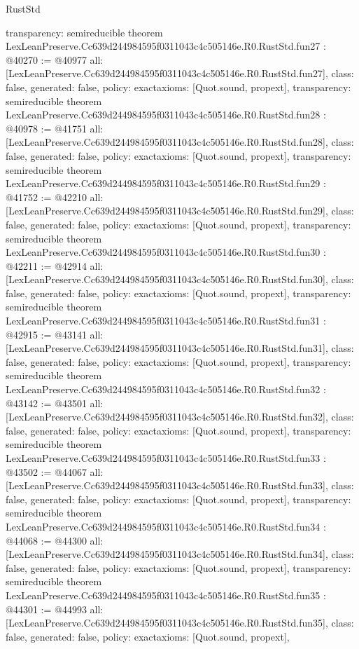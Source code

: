 \begin{lexlean}{RustStd}
\begin{coremodule}
{  transparency: semireducible
}
theorem LexLeanPreserve.Cc639d244984595f0311043c4c505146e.R0.RustStd.fun27 : @40270 := @40977 {
  all: [LexLeanPreserve.Cc639d244984595f0311043c4c505146e.R0.RustStd.fun27],
  class: false,
  generated: false,
  policy: exact{axioms: [Quot.sound, propext]},
  transparency: semireducible
}
theorem LexLeanPreserve.Cc639d244984595f0311043c4c505146e.R0.RustStd.fun28 : @40978 := @41751 {
  all: [LexLeanPreserve.Cc639d244984595f0311043c4c505146e.R0.RustStd.fun28],
  class: false,
  generated: false,
  policy: exact{axioms: [Quot.sound, propext]},
  transparency: semireducible
}
theorem LexLeanPreserve.Cc639d244984595f0311043c4c505146e.R0.RustStd.fun29 : @41752 := @42210 {
  all: [LexLeanPreserve.Cc639d244984595f0311043c4c505146e.R0.RustStd.fun29],
  class: false,
  generated: false,
  policy: exact{axioms: [Quot.sound, propext]},
  transparency: semireducible
}
theorem LexLeanPreserve.Cc639d244984595f0311043c4c505146e.R0.RustStd.fun30 : @42211 := @42914 {
  all: [LexLeanPreserve.Cc639d244984595f0311043c4c505146e.R0.RustStd.fun30],
  class: false,
  generated: false,
  policy: exact{axioms: [Quot.sound, propext]},
  transparency: semireducible
}
theorem LexLeanPreserve.Cc639d244984595f0311043c4c505146e.R0.RustStd.fun31 : @42915 := @43141 {
  all: [LexLeanPreserve.Cc639d244984595f0311043c4c505146e.R0.RustStd.fun31],
  class: false,
  generated: false,
  policy: exact{axioms: [Quot.sound, propext]},
  transparency: semireducible
}
theorem LexLeanPreserve.Cc639d244984595f0311043c4c505146e.R0.RustStd.fun32 : @43142 := @43501 {
  all: [LexLeanPreserve.Cc639d244984595f0311043c4c505146e.R0.RustStd.fun32],
  class: false,
  generated: false,
  policy: exact{axioms: [Quot.sound, propext]},
  transparency: semireducible
}
theorem LexLeanPreserve.Cc639d244984595f0311043c4c505146e.R0.RustStd.fun33 : @43502 := @44067 {
  all: [LexLeanPreserve.Cc639d244984595f0311043c4c505146e.R0.RustStd.fun33],
  class: false,
  generated: false,
  policy: exact{axioms: [Quot.sound, propext]},
  transparency: semireducible
}
theorem LexLeanPreserve.Cc639d244984595f0311043c4c505146e.R0.RustStd.fun34 : @44068 := @44300 {
  all: [LexLeanPreserve.Cc639d244984595f0311043c4c505146e.R0.RustStd.fun34],
  class: false,
  generated: false,
  policy: exact{axioms: [Quot.sound, propext]},
  transparency: semireducible
}
theorem LexLeanPreserve.Cc639d244984595f0311043c4c505146e.R0.RustStd.fun35 : @44301 := @44993 {
  all: [LexLeanPreserve.Cc639d244984595f0311043c4c505146e.R0.RustStd.fun35],
  class: false,
  generated: false,
  policy: exact{axioms: [Quot.sound, propext]},
}
\end{coremodule}
\end{lexlean}
